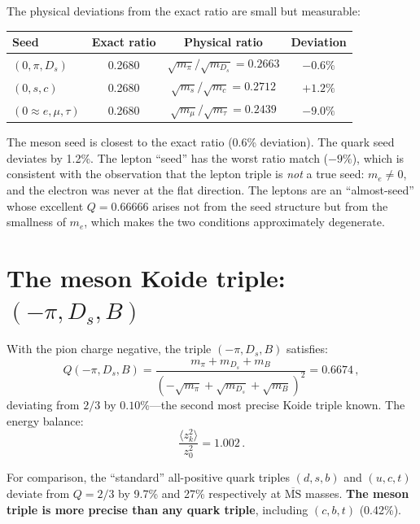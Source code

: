 \documentclass[12pt,a4paper]{article}
\begin{document}
The physical deviations from the exact ratio are small but
measurable:

\begin{center}
\begin{tabular}{lccc}
\toprule
Seed & Exact ratio & Physical ratio & Deviation \\
\midrule
$(0, \pi, D_s)$ & 0.2680 &
$\sqrt{m_\pi}/\sqrt{m_{D_s}} = 0.2663$ & $-0.6\%$ \\
$(0, s, c)$ & 0.2680 &
$\sqrt{m_s}/\sqrt{m_c} = 0.2712$ & $+1.2\%$ \\
$(0 \approx e, \mu, \tau)$ & 0.2680 &
$\sqrt{m_\mu}/\sqrt{m_\tau} = 0.2439$ & $-9.0\%$ \\
\bottomrule
\end{tabular}
\end{center}

The meson seed is closest to the exact ratio (0.6\% deviation).
The quark seed deviates by 1.2\%. The lepton ``seed'' has the worst ratio match ($-9\%$), which
is consistent with the observation that the lepton triple is
\emph{not} a true seed: $m_e \neq 0$, and the electron was never
at the flat direction. The leptons are an ``almost-seed'' whose
excellent $Q = 0.66666$ arises not from the seed structure but
from the smallness of $m_e$, which makes the two conditions
approximately degenerate.

\section{The meson Koide triple: $(-\pi, D_s, B)$}

With the pion charge negative, the triple $(-\pi, D_s, B)$ satisfies:
\begin{equation}
Q(-\pi, D_s, B) =
\frac{m_\pi + m_{D_s} + m_B}{(-\sqrt{m_\pi} + \sqrt{m_{D_s}} + \sqrt{m_B})^2}
= 0.6674\,,
\end{equation}
deviating from $2/3$ by $0.10\%$---the second most precise Koide
triple known. The energy balance:
\begin{equation}
\frac{\langle z_k^2\rangle}{z_0^2} = 1.002\,.
\end{equation}

For comparison, the ``standard'' all-positive quark triples $(d,s,b)$
and $(u,c,t)$ deviate from $Q = 2/3$ by 9.7\% and 27\% respectively
at $\overline{\text{MS}}$ masses. \textbf{The meson triple is more
precise than any quark triple}, including $(c,b,t)$ (0.42\%).
\end{document}

